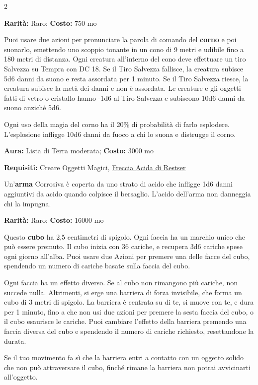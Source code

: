 \begin{multicols}{2}

\textbf{Rarità:} Raro; \textbf{Costo:} 750 mo

Puoi usare due azioni per pronunciare la parola di comando del \textbf{corno} e poi suonarlo, emettendo uno scoppio tonante in un cono di 9 metri e udibile fino a 180 metri di distanza. Ogni creatura all'interno del cono deve effettuare un tiro Salvezza su Tempra con DC 18. Se il Tiro Salvezza fallisce, la creatura subisce 5d6 danni da suono e resta assordata per 1 minuto. Se il Tiro Salvezza riesce, la creatura subisce la metà dei danni e non è assordata. Le creature e gli oggetti fatti di vetro o cristallo hanno -1d6 al Tiro Salvezza e subiscono 10d6 danni da suono anziché 5d6.

Ogni uso della magia del corno ha il 20\% di probabilità di farlo esplodere. L'esplosione infligge 10d6 danni da fuoco a chi lo suona e distrugge il corno.


\textbf{Aura:} Lista di Terra moderata; \textbf{Costo:} 3000 mo

\textbf{Requisiti:} Creare Oggetti Magici, \hyperlink{Freccia Acida di Restser}{Freccia Acida di Restser}

Un'\textbf{arma} Corrosiva è coperta da uno strato di acido che infligge 1d6 danni aggiuntivi da acido quando colpisce il bersaglio. L'acido dell'arma non danneggia chi la impugna.


\textbf{Rarità:} Raro; \textbf{Costo:} 16000 mo

Questo \textbf{cubo} ha 2,5 centimetri di spigolo. Ogni faccia ha un marchio unico che può essere premuto. Il cubo inizia con 36 cariche, e recupera 3d6 cariche spese ogni giorno all'alba. Puoi usare due Azioni per premere una delle facce del cubo, spendendo un numero di cariche basate sulla faccia del cubo.

Ogni faccia ha un effetto diverso. Se al cubo non rimangono più cariche, non succede nulla. Altrimenti, si erge una barriera di forza invisibile, che forma un cubo di 3 metri di spigolo. La barriera è centrata su di te, si muove con te, e dura per 1 minuto, fino a che non usi due azioni per premere la sesta faccia del cubo, o il cubo esaurisce le cariche. Puoi cambiare l'effetto della barriera premendo una faccia diversa del cubo e spendendo il numero di cariche richiesto, resettandone la durata.

Se il tuo movimento fa sì che la barriera entri a contatto con un oggetto solido che non può attraversare il cubo, finché rimane la barriera non potrai avvicinarti all'oggetto.


\end{multicols}

